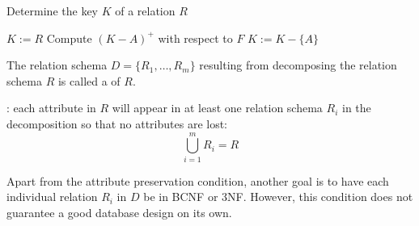       \begin{algorithm}[H]
        \caption{Determine the key $K$ of a relation $R$}
        \begin{algorithmic}[1]
          \State $K := R$
            \State Compute $(K - A)^+$ with respect to $F$
              \State $K := K - \{A\}$
            \EndIf
          \EndFor
        \end{algorithmic}
      \end{algorithm}

    \par The relation schema $D = \{R_1, \ldots, R_m\}$ resulting from decomposing the relation schema $R$ is called a  of $R$.
    \par {}: each attribute in $R$ will appear in at least one relation schema $R_i$ in the decomposition so that no attributes are lost:
    \[
      \bigcup\limits_{i = 1}^{m} R_i = R
    \]
    \par Apart from the attribute preservation condition, another goal is to have each individual relation $R_i$ in $D$ be in BCNF or 3NF. However, this condition does not guarantee a good database design on its own.


